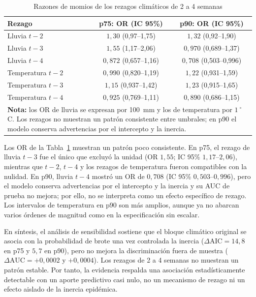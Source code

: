 \documentclass[11pt,a4paper]{article}
\begin{document}
\begin{table}[htbp]
	\centering
	\footnotesize
	\setlength{\tabcolsep}{5pt}
	\caption{Razones de momios de los rezagos climáticos de 2 a 4 semanas}
	\label{tab:or_rezagos}
	\begin{tabular}{lcc}
		\toprule
		\textbf{Rezago} & \textbf{p75: OR (IC 95\%)} & \textbf{p90: OR (IC 95\%)} \\
		\midrule
		Lluvia $t-2$ & $1{,}30$ (0,97--1,75) & $1{,}32$ (0,92--1,90) \\
		Lluvia $t-3$ & $1{,}55$ (1,17--2,06) & $0{,}970$ (0,689--1,37) \\
		Lluvia $t-4$ & $0{,}872$ (0,657--1,16) & $0{,}708$ (0,503--0,996) \\
		Temperatura $t-2$ & $0{,}990$ (0,820--1,19) & $1{,}22$ (0,931--1,59) \\
		Temperatura $t-3$ & $1{,}15$ (0,937--1,42) & $1{,}23$ (0,915--1,65) \\
		Temperatura $t-4$ & $0{,}925$ (0,769--1,11) & $0{,}890$ (0,686--1,15) \\
		\midrule
		\multicolumn{3}{p{14.5cm}}{\footnotesize \textbf{Nota:} los OR de lluvia se expresan por 100~mm y los de temperatura por $1~^\circ$C. Los rezagos no muestran un patrón consistente entre umbrales; en p90 el modelo conserva advertencias por el intercepto y la inercia.} \\
		\bottomrule
	\end{tabular}
\end{table}

Los OR de la Tabla~\ref{tab:or_rezagos} muestran un patrón poco consistente. En p75, el rezago de lluvia $t-3$ fue el único que excluyó la unidad (OR $1{,}55$; IC 95\% $1{,}17$--$2{,}06$), mientras que $t-2$, $t-4$ y los rezagos de temperatura fueron compatibles con la nulidad. En p90, lluvia $t-4$ mostró un OR de $0{,}708$ (IC 95\% $0{,}503$--$0{,}996$), pero el modelo conserva advertencias por el intercepto y la inercia y su AUC de prueba no mejora; por ello, no se interpreta como un efecto específico de rezago. Los intervalos de temperatura en p90 son más amplios, aunque ya no abarcan varios órdenes de magnitud como en la especificación sin escalar.

\medskip

En síntesis, el análisis de sensibilidad sostiene que el bloque climático original se asocia con la probabilidad de brote una vez controlada la inercia ($\Delta\text{AIC} = 14{,}8$ en p75 y $5{,}7$ en p90), pero no mejora la discriminación fuera de muestra ($\Delta\text{AUC} = +0{,}0002$ y $+0{,}0004$). Los rezagos de 2 a 4 semanas no muestran un patrón estable. Por tanto, la evidencia respalda una asociación estadísticamente detectable con un aporte predictivo casi nulo, no un mecanismo de rezago ni un efecto aislado de la inercia epidémica.
\end{document}

